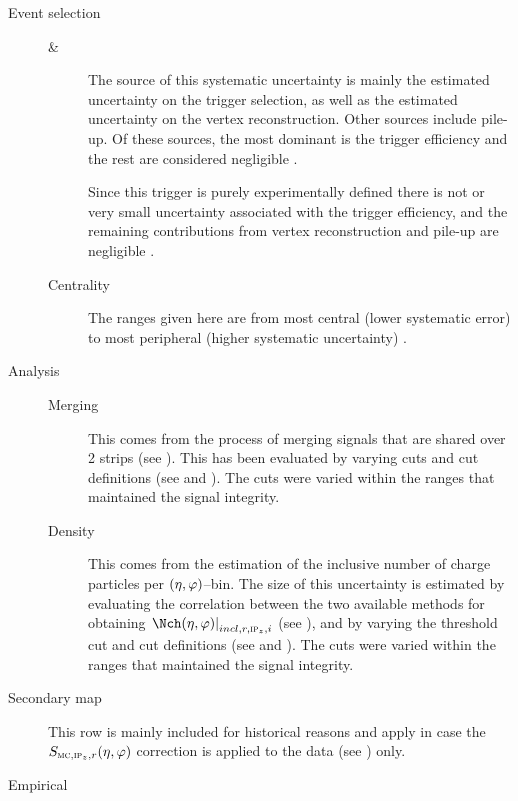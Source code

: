 \begin{description}
\item[Event selection] \hbox{}\hfill
  \begin{description}
  \item[\INEL{} \& \NSD{}] The source of this systematic uncertainty
    is mainly the estimated uncertainty on the trigger selection, as
    well as the estimated uncertainty on the vertex reconstruction.
    Other sources include pile-up.  Of these sources, the most
    dominant is the trigger efficiency and the rest are considered
    negligible \cite{pwgud:2015}.
  \item[\INELGT{}] Since this trigger is purely experimentally defined
    there is not or very small uncertainty associated with the trigger
    efficiency, and the remaining contributions from vertex
    reconstruction and pile-up are negligible \cite{pwgud:2015}.
  \item[Centrality] The ranges given here are from most central (lower
    systematic error) to most peripheral (higher systematic uncertainty)
    \cite{Adam:2014qja,PbPbCent:XXX}.
  \end{description}
\item[Analysis] \hbox{}\hfill
  \begin{description}
  \item[Merging] This comes from the process of merging signals that
    are shared over 2 strips (see ).
    This has been evaluated by varying cuts and cut definitions (see
     and ). The cuts were
    varied within the ranges that maintained the signal integrity.
  \item[Density] This comes from the estimation of the inclusive
    number of charge particles per $(\eta,\varphi)$--bin.  The size of this
    uncertainty is estimated by evaluating the correlation between the
    two available methods for obtaining
    $\dndetadphi[incl,r,\subIPz,i]$ (see
    ), and by varying the threshold
    cut and cut definitions (see  and
    ).  The cuts were varied within the ranges
    that maintained the signal integrity.
  \end{description}
\item[Secondary map] This row is mainly included for historical
  reasons and apply in case the $\SecMap$ correction is
  applied to the data (see ) only. 
\item[Empirical] \hbox{}\hfill 

\end{description}
